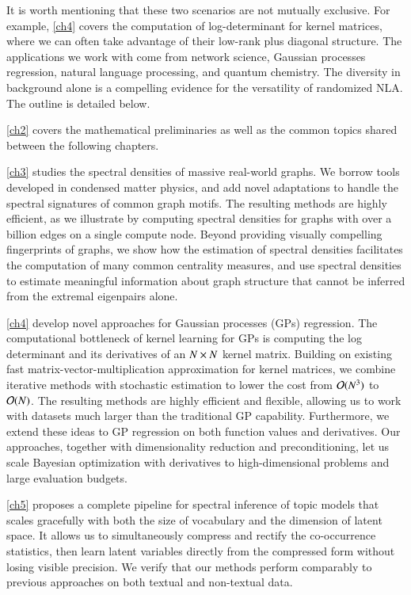 It is worth mentioning that these two scenarios are not mutually exclusive.
For example, \cref{ch4} covers the computation of log\hyp{}determinant for
kernel matrices, where we can often take advantage of their low\hyp{}rank plus
diagonal structure. The applications we work with come from network science,
Gaussian processes regression, natural language processing, and quantum
chemistry. The diversity in background alone is a compelling evidence for the
versatility of randomized NLA. The outline is detailed below.

\cref{ch2} covers the mathematical preliminaries as well as the common topics
shared between the following chapters.

\cref{ch3} studies the spectral densities of massive real-world graphs. We
borrow tools developed in condensed matter physics, and add novel adaptations to
handle the spectral signatures of common graph motifs.  The resulting methods
are highly efficient, as we illustrate by computing spectral densities for
graphs with over a billion edges on a single compute node. Beyond providing
visually compelling fingerprints of graphs, we show how the  estimation of
spectral densities facilitates the computation of many common centrality
measures, and use spectral densities to estimate meaningful information about
graph structure that cannot be inferred from the extremal eigenpairs alone.

\cref{ch4} develop novel approaches for Gaussian processes (GPs) regression.
The computational bottleneck of kernel learning for GPs is computing the log
determinant and its derivatives of an $N\mathbin{\times} N$ kernel matrix. Building on
existing fast matrix-vector-multiplication approximation for kernel
matrices, we combine iterative methods with stochastic estimation to
lower the cost from $\mathcal{O}(N^3)$ to $\mathcal{O}(N)$. The resulting methods are highly
efficient and flexible, allowing us to work with datasets much larger than
the traditional GP capability. Furthermore, we extend these ideas to GP
regression on both function values and derivatives. Our approaches, together
with dimensionality reduction and preconditioning, let us scale Bayesian
optimization with derivatives to high-dimensional problems and large evaluation
budgets.

\cref{ch5} proposes a complete pipeline for spectral inference of topic
models that scales gracefully with both the size of vocabulary and the dimension
of latent space. It allows us to simultaneously compress and rectify the 
co\hyp{}occurrence statistics, then learn latent variables directly from the
compressed form without losing visible precision. We verify that our
methods perform comparably to previous approaches on both textual and
non-textual data.

